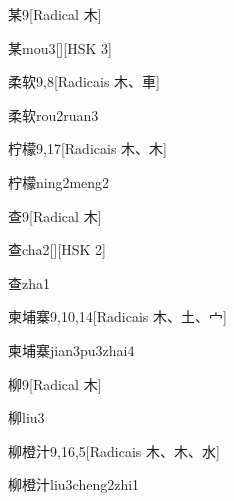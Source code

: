 \begin{entry}{某}{9}[Radical ⽊]
  \begin{phonetics}{某}{mou3}[][HSK 3]
  \end{phonetics}
\end{entry}

\begin{entry}{柔软}{9,8}[Radicais ⽊、⾞]
  \begin{phonetics}{柔软}{rou2ruan3}
  \end{phonetics}
\end{entry}

\begin{entry}{柠檬}{9,17}[Radicais ⽊、⽊]
  \begin{phonetics}{柠檬}{ning2meng2}
  \end{phonetics}
\end{entry}

\begin{entry}{查}{9}[Radical ⽊]
  \begin{phonetics}{查}{cha2}[][HSK 2]
  \end{phonetics}
  \begin{phonetics}{查}{zha1}
  \end{phonetics}
\end{entry}

\begin{entry}{柬埔寨}{9,10,14}[Radicais ⽊、⼟、⼧]
  \begin{phonetics}{柬埔寨}{jian3pu3zhai4}
  \end{phonetics}
\end{entry}

\begin{entry}{柳}{9}[Radical ⽊]
  \begin{phonetics}{柳}{liu3}
  \end{phonetics}
\end{entry}

\begin{entry}{柳橙汁}{9,16,5}[Radicais ⽊、⽊、⽔]
  \begin{phonetics}{柳橙汁}{liu3cheng2zhi1}
  \end{phonetics}
\end{entry}

